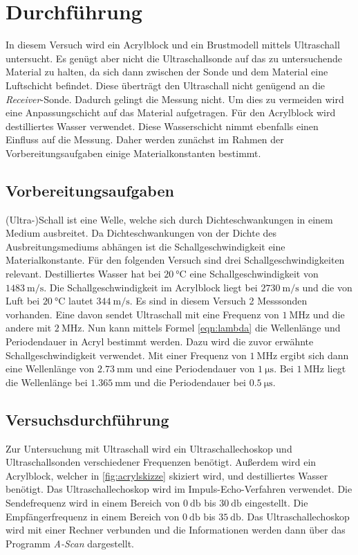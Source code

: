 \section{Durchführung}
\label{sec:Durchführung}
In diesem Versuch wird ein Acrylblock und ein Brustmodell mittels Ultraschall untersucht. Es genügt aber nicht die Ultraschallsonde auf das zu untersuchende Material zu halten, da sich dann
zwischen der Sonde und dem Material eine Luftschicht befindet. Diese überträgt den Ultraschall nicht genügend an die \textit{Receiver}-Sonde. Dadurch gelingt die Messung nicht. Um dies zu vermeiden
wird eine Anpassungschicht auf das Material aufgetragen. Für den Acrylblock wird destilliertes Wasser verwendet. Diese Wasserschicht nimmt ebenfalls einen Einfluss auf die Messung. Daher werden
zunächst im Rahmen der Vorbereitungsaufgaben einige Materialkonstanten bestimmt.
\subsection{Vorbereitungsaufgaben}
\label{subsec:VBA}
(Ultra-)Schall ist eine Welle, welche sich durch Dichteschwankungen in einem Medium ausbreitet. Da Dichteschwankungen von der Dichte des Ausbreitungsmediums abhängen ist die Schallgeschwindigkeit
eine  Materialkonstante. Für den folgenden Versuch sind drei Schallgeschwindigkeiten relevant. Destilliertes Wasser hat bei $\qty{20}{\celsius}$ eine Schallgeschwindigkeit von $\qty{1483}{\metre\per\second}$.
Die Schallgeschwindigkeit im Acrylblock liegt bei $\qty{2730}{\metre\per\second}$ und die von Luft bei $\qty{20}{\celsius}$ lautet $\qty{344}{\metre\per\second}$.
Es sind in diesem Versuch 2 Messsonden vorhanden. Eine davon sendet Ultraschall mit eine Frequenz von $\qty{1}{\mega\hertz}$ und die andere mit $\qty{2}{\mega\hertz}$. Nun kann mittels Formel
\eqref{eqn:lambda} die Wellenlänge und Periodendauer in Acryl bestimmt werden. Dazu wird die zuvor erwähnte Schallgeschwindigkeit
verwendet. Mit einer Frequenz von $\qty{1}{\mega\hertz}$ ergibt sich dann eine Wellenlänge von $\qty{2.73}{\milli\metre}$ und eine Periodendauer von $\qty{1}{\micro\second}$. Bei $\qty{1}{\mega\hertz}$
liegt die Wellenlänge bei $\qty{1.365}{\milli\metre}$ und die Periodendauer bei $\qty{0.5}{\micro\second}$.
\subsection{Versuchsdurchführung}
\label{subsec:Versuchsdurchführung}
Zur Untersuchung mit Ultraschall wird ein Ultraschallechoskop und Ultraschallsonden verschiedener Frequenzen benötigt. Außerdem wird ein Acrylblock, welcher in \autoref{fig:acrylskizze} skiziert wird, und destilliertes Wasser benötigt. 
Das Ultraschallechoskop wird im Impuls-Echo-Verfahren verwendet. Die Sendefrequenz wird in einem Bereich von $\qty{0}{\decibel}$ bis $\qty{30}{\decibel}$ eingestellt. Die 
Empfängerfrequenz in einem Bereich von $\qty{0}{\decibel}$ bis $\qty{35}{\decibel}$. Das Ultraschallechoskop wird mit einer Rechner verbunden und die Informationen werden dann 
über das Programm \textit{A-Scan} dargestellt. 

